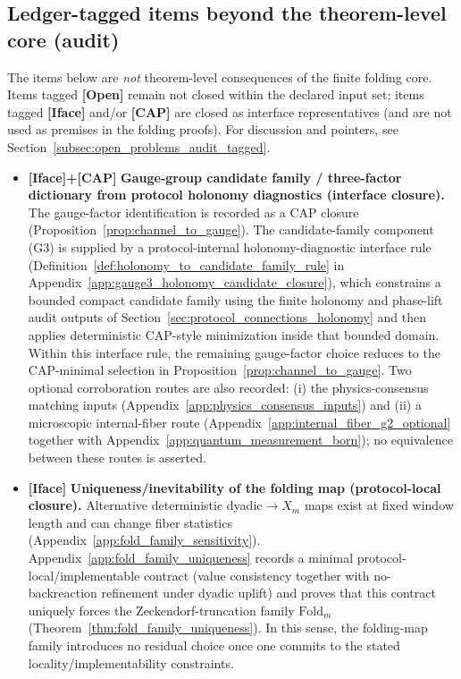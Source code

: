 \subsection{Ledger-tagged items beyond the theorem-level core (audit)}
\label{subsec:ledger_open_problems}
The items below are \emph{not} theorem-level consequences of the finite folding core.
Items tagged \textbf{[Open]} remain not closed within the declared input set; items tagged \textbf{[Iface]} and/or \textbf{[CAP]} are closed as interface representatives (and are not used as premises in the folding proofs).
For discussion and pointers, see Section~\ref{subsec:open_problems_audit_tagged}.
\begin{itemize}
  \item \textbf{[Iface]+[CAP]} \textbf{Gauge-group candidate family / three-factor dictionary from protocol holonomy diagnostics (interface closure).}
  The gauge-factor identification is recorded as a CAP closure (Proposition~\ref{prop:channel_to_gauge}).
  The candidate-family component (G3) is supplied by a protocol-internal holonomy-diagnostic interface rule (Definition~\ref{def:holonomy_to_candidate_family_rule} in Appendix~\ref{app:gauge3_holonomy_candidate_closure}), which constrains a bounded compact candidate family using the finite holonomy and phase-lift audit outputs of Section~\ref{sec:protocol_connections_holonomy} and then applies deterministic CAP-style minimization inside that bounded domain.
  Within this interface rule, the remaining gauge-factor choice reduces to the CAP-minimal selection in Proposition~\ref{prop:channel_to_gauge}.
  \AuditTag Two optional corroboration routes are also recorded: (i) the physics-consensus matching inputs (Appendix~\ref{app:physics_consensus_inputs}) and (ii) a microscopic internal-fiber route (Appendix~\ref{app:internal_fiber_g2_optional} together with Appendix~\ref{app:quantum_measurement_born}); no equivalence between these routes is asserted.

  \item \textbf{[Iface]} \textbf{Uniqueness/inevitability of the folding map (protocol-local closure).}
  Alternative deterministic dyadic$\to X_m$ maps exist at fixed window length and can change fiber statistics (Appendix~\ref{app:fold_family_sensitivity}).
  Appendix~\ref{app:fold_family_uniqueness} records a minimal protocol-local/implementable contract (value consistency together with no-backreaction refinement under dyadic uplift) and proves that this contract uniquely forces the Zeckendorf-truncation family $\mathrm{Fold}_m$ (Theorem~\ref{thm:fold_family_uniqueness}).
  In this sense, the folding-map family introduces no residual choice once one commits to the stated locality/implementability constraints.


\end{itemize}

